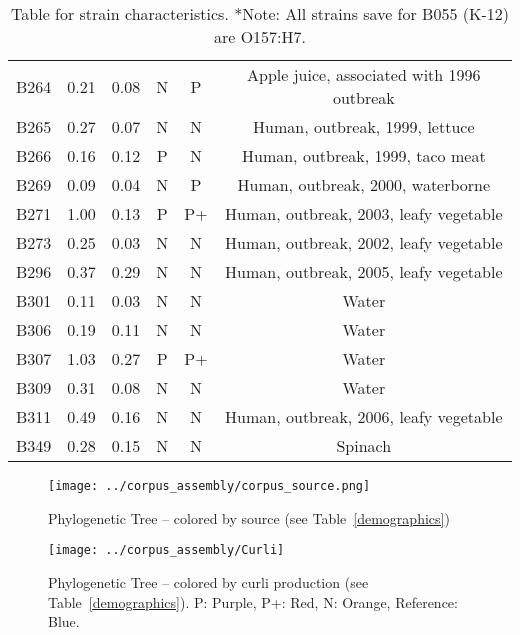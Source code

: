 \documentclass[11pt]{article}
\begin{document}
\begin{table}[h!]
\begin{tabular}{c|c|c|c|c|c}
B264 & 0.21 & 0.08 & N & P &   Apple juice, associated with 1996 outbreak    \\
B265 & 0.27 & 0.07 & N & N &   Human, outbreak, 1999, lettuce                \\
B266 & 0.16 & 0.12 & P & N &   Human, outbreak, 1999, taco meat              \\
B269 & 0.09 & 0.04 & N & P &   Human, outbreak, 2000, waterborne             \\
B271 & 1.00 & 0.13 & P & P+ &  Human, outbreak, 2003, leafy vegetable        \\
B273 & 0.25 & 0.03 & N & N &   Human, outbreak, 2002, leafy vegetable        \\
B296 & 0.37 & 0.29 & N & N &   Human, outbreak, 2005, leafy vegetable        \\
B301 & 0.11 & 0.03 & N & N &   Water                                         \\
B306 & 0.19 & 0.11 & N & N &   Water                                         \\
B307 & 1.03 & 0.27 & P & P+ &  Water                                         \\
B309 & 0.31 & 0.08 & N & N &   Water                                         \\
B311 & 0.49 & 0.16 & N & N &   Human, outbreak, 2006, leafy vegetable        \\
B349 & 0.28 & 0.15 & N & N &   Spinach                                       \\
\hline
\end{tabular}
\caption{Table for strain characteristics. *Note: All strains save for B055 (K-12) are O157:H7.}
\label{demographics_2}
\end{table}


\begin{figure}[ht!]\normalsize %
\centering
\texttt{[image: ../corpus\_assembly/corpus\_source.png]}
\caption{Phylogenetic Tree -- colored by source (see Table~\ref{demographics})}
\label{source_tree}
\end{figure}
\clearpage

\begin{figure}[ht!]\normalsize %
\centering
\texttt{[image: ../corpus\_assembly/Curli]}
\caption{Phylogenetic Tree -- colored by curli production (see Table~\ref{demographics}). P: Purple, P+: Red, N: Orange, Reference: Blue.}
\label{curli_tree}
\end{figure}
\clearpage
\end{document}
